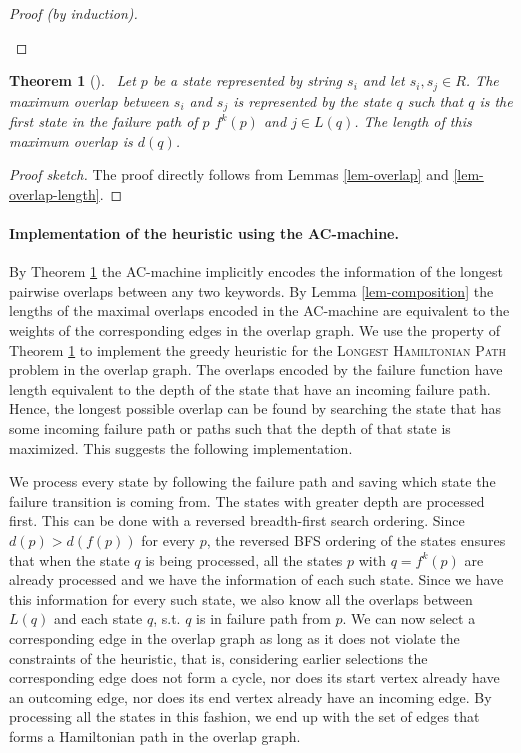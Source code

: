 \documentclass[english,twoside,censored,csm,algorithms-track-2020]{HYthesisML}
\theoremstyle{plain}
\newtheorem{theorem}{Theorem}[chapter]
\theoremstyle{definition}
\begin{document}
\begin{proof}[Proof (by induction)]
\begin{enumerate}[leftmargin=28pt]
  \end{enumerate}
\end{proof}

\begin{theorem}[]~\label{thm-maximal-overlaps}
  Let $p$ be a state represented by string $s_i$ and let $s_i,s_j\in R$. The maximum overlap between
  $s_i$ and $s_j$ is represented by the state $q$ such that $q$ is the first state in the failure
  path of $p$ $f^k(p)$ and $j\in L(q)$. The length of this maximum overlap is $d(q)$.
\end{theorem}
\begin{proof}[Proof sketch]
  The proof directly follows from Lemmas \ref{lem-overlap} and \ref{lem-overlap-length}.
\end{proof}

\paragraph{Implementation of the heuristic using the AC-machine.}
By Theorem \ref{thm-maximal-overlaps} the AC-machine implicitly encodes the information of the
longest pairwise overlaps between any two keywords. By Lemma \ref{lem-composition} the lengths of the
maximal overlaps encoded in the AC-machine are equivalent to the weights of the corresponding edges
in the overlap graph. We use the property of Theorem \ref{thm-maximal-overlaps} to implement
the greedy heuristic for the \textsc{Longest Hamiltonian Path} problem in the overlap graph. The
overlaps encoded by the failure function have length equivalent to the depth of the state that
have an incoming failure path. Hence, the longest possible overlap can be found by searching the state
that has some incoming failure path or paths such that the depth of that state is maximized. This suggests
the following implementation.

We process every state by following the failure path and saving 
which state the failure transition is coming from. 
The states with greater depth are processed first. This can be done with a reversed breadth-first
search ordering. Since $d(p) > d(f(p))$ for every $p$, the reversed BFS ordering of the states
ensures that when the state $q$ is being processed, all the states $p$ with $q=f^k(p)$ are already
processed and we have the information of each such state. Since we have this information for every such
state, we also know all the overlaps between $L(q)$ and each state $q$, s.t.
$q$ is in failure path from $p$. We can now select a corresponding edge in the overlap graph as long
as it does not violate the constraints of the heuristic, that is, considering earlier selections
the corresponding edge does not form a cycle, nor does its start vertex already have an outcoming
edge, nor does its end vertex already have an incoming edge. By processing all the states in this
fashion, we end up with the set of edges that forms a Hamiltonian path in the
overlap graph. 
\end{document}
